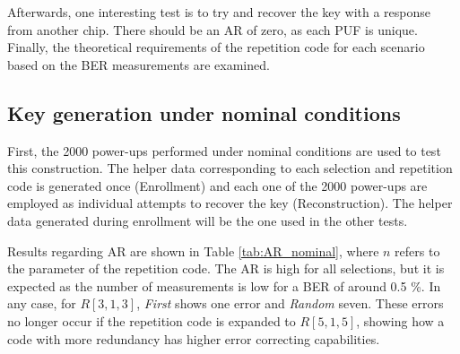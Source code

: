 Afterwards, one interesting test is to try and recover the key with a response from another chip. There should be an AR of zero, as each PUF is unique. Finally, the theoretical requirements of the repetition code for each scenario based on the BER measurements are examined. 



\subsection{Key generation under nominal conditions}

First, the 2000 power-ups performed under nominal conditions are used to test this construction. The helper data corresponding to each selection and repetition code is generated once (Enrollment) and each one of the 2000 power-ups are employed as individual attempts to recover the key (Reconstruction). The helper data generated during enrollment will be the one used in the other tests.

Results regarding AR are shown in Table \ref{tab:AR_nominal}, where $n$ refers to the parameter of the repetition code. The AR is high for all selections, but it is expected as the number of measurements is low for a BER of around 0.5 \%. In any case, for $R[3,1,3]$, \textit{First} shows one error and \textit{Random} seven. These errors no longer occur if the repetition code is expanded to $R[5,1,5]$, showing how a code with more redundancy has higher error correcting capabilities.   



